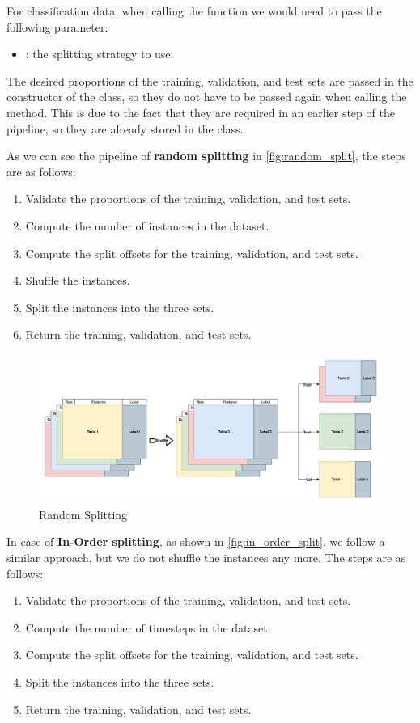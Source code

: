\documentclass[review]{AIM_report}
\begin{document}
For classification data, when calling the function \splitShort we would need to pass the following parameter:
\begin{itemize}
    \item \splitStrategy: the splitting strategy to use.
\end{itemize}

The desired proportions of the training, validation, and test sets are passed in the constructor of the class, so they do not have to be passed again when calling the \splitShort method. This is due to the fact that they are required in an earlier step of the pipeline, so they are already stored in the class.

As we can see the pipeline of \textbf{random splitting} in \autoref{fig:random_split}, the steps are as follows:
\begin{enumerate}
    \item Validate the proportions of the training, validation, and test sets.
    \item Compute the number of instances in the dataset.
    \item Compute the split offsets for the training, validation, and test sets.
    \item Shuffle the instances.
    \item Split the instances into the three sets.
    \item Return the training, validation, and test sets.
\end{enumerate}

\begin{figure}[H]
    \centering
    \includegraphics[width=1\textwidth]{files/splitting/random_split.png}
    \caption{Random Splitting}
    \label{fig:random_split}
\end{figure}

In case of \textbf{In-Order splitting}, as shown in \autoref{fig:in_order_split}, we follow a similar approach, but we do not shuffle the instances any more. The steps are as follows:
\begin{enumerate}
    \item Validate the proportions of the training, validation, and test sets.
    \item Compute the number of timesteps in the dataset.
    \item Compute the split offsets for the training, validation, and test sets.
    \item Split the instances into the three sets.
    \item Return the training, validation, and test sets.
\end{enumerate}
\end{document}
